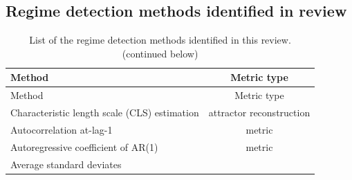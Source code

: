 \documentclass[12pt,twoside,openany]{reedthesis}
\begin{document}
\subsection{Regime detection methods identified in
review}\label{regime-detection-methods-identified-in-review}
\begin{longtable}[]{@{}lc@{}}
\caption{List of the regime detection methods identified in this review.
(continued below)}\tabularnewline
\toprule
\begin{minipage}[b]{0.31\columnwidth}\raggedright\strut
Method\strut
\end{minipage} & \begin{minipage}[b]{0.34\columnwidth}\centering\strut
Metric type\strut
\end{minipage}\tabularnewline
\midrule
\endfirsthead
\toprule
\begin{minipage}[b]{0.31\columnwidth}\raggedright\strut
Method\strut
\end{minipage} & \begin{minipage}[b]{0.34\columnwidth}\centering\strut
Metric type\strut
\end{minipage}\tabularnewline
\midrule
\endhead
\begin{minipage}[t]{0.31\columnwidth}\raggedright\strut
Characteristic length scale (CLS) estimation\strut
\end{minipage} & \begin{minipage}[t]{0.34\columnwidth}\centering\strut
attractor reconstruction\strut
\end{minipage}\tabularnewline
\begin{minipage}[t]{0.31\columnwidth}\raggedright\strut
Autocorrelation at-lag-1\strut
\end{minipage} & \begin{minipage}[t]{0.34\columnwidth}\centering\strut
metric\strut
\end{minipage}\tabularnewline
\begin{minipage}[t]{0.31\columnwidth}\raggedright\strut
Autoregressive coefficient of AR(1)\strut
\end{minipage} & \begin{minipage}[t]{0.34\columnwidth}\centering\strut
metric\strut
\end{minipage}\tabularnewline
\begin{minipage}[t]{0.31\columnwidth}\raggedright\strut
Average standard deviates\strut
\end{minipage} & \begin{minipage}[t]{0.34\columnwidth}\centering\strut

\end{minipage}
\end{longtable}
\end{document}
